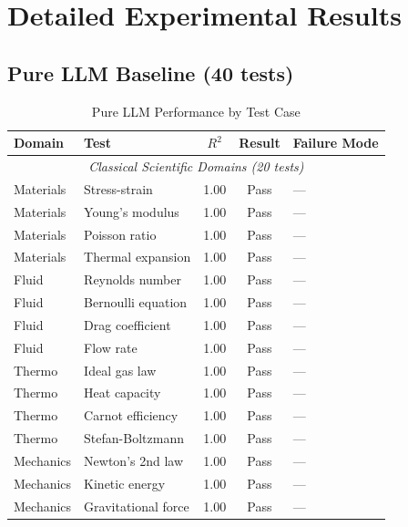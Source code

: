 \documentclass[twoside,11pt]{article}
\begin{document}


\section{Detailed Experimental Results}
\label{app:detailed_results}

\subsection{Pure LLM Baseline (40 tests)}

\begin{table}[H]
\centering
\caption{Pure LLM Performance by Test Case}
\label{tab:llm_detailed}
\begin{small}
\begin{tabular}{@{}llccp{5.2cm}@{}}
\toprule
\textbf{Domain} & \textbf{Test} & \textbf{$R^2$} & \textbf{Result} & \textbf{Failure Mode} \\
\midrule
\multicolumn{5}{c}{\textit{Classical Scientific Domains (20 tests)}} \\
\midrule
Materials & Stress-strain & 1.00 & Pass & --- \\
Materials & Young's modulus & 1.00 & Pass & --- \\
Materials & Poisson ratio & 1.00 & Pass & --- \\
Materials & Thermal expansion & 1.00 & Pass & --- \\
Fluid & Reynolds number & 1.00 & Pass & --- \\
Fluid & Bernoulli equation & 1.00 & Pass & --- \\
Fluid & Drag coefficient & 1.00 & Pass & --- \\
Fluid & Flow rate & 1.00 & Pass & --- \\
Thermo & Ideal gas law & 1.00 & Pass & --- \\
Thermo & Heat capacity & 1.00 & Pass & --- \\
Thermo & Carnot efficiency & 1.00 & Pass & --- \\
Thermo & Stefan-Boltzmann & 1.00 & Pass & --- \\
Mechanics & Newton's 2nd law & 1.00 & Pass & --- \\
Mechanics & Kinetic energy & 1.00 & Pass & --- \\
Mechanics & Gravitational force & 1.00 & Pass & --- \\

\end{tabular}
\end{small}
\end{table}
\end{document}
